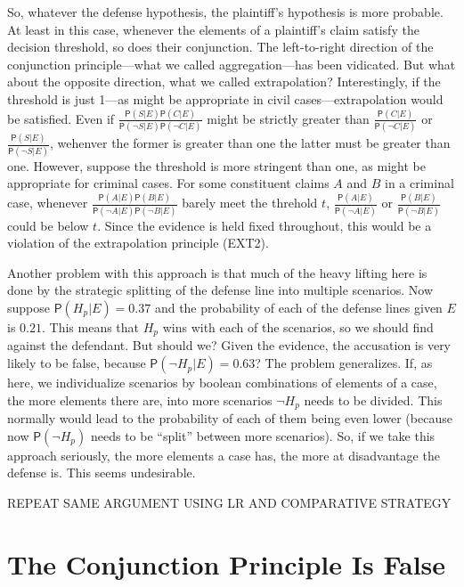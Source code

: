 \documentclass[10pt,dvipsnames,enabledeprecatedfontcommands]{scrartcl}
\newcommand{\n}{\neg}
\newcommand{\pr}[1]{\mathsf{P}(#1)}
\begin{document}
\noindent So, whatever the defense hypothesis, the plaintiff's
hypothesis is more probable. At least in this case, whenever the
elements of a plaintiff's claim satisfy the decision threshold, so does
their conjunction. The left-to-right direction of the conjunction
principle---what we called aggregation---has been vidicated. But what
about the opposite direction, what we called extrapolation?
Interestingly, if the threshold is just 1---as might be appropriate in
civil cases---extrapolation would be satisfied. Even if
\(\frac{\pr{S\vert E}\pr{C\vert E}}{\pr{\n S \vert E}\pr{\n C \vert E}}\)
might be strictly greater than
\(\frac{\pr{C\vert E}}{\pr{\n C \vert E}}\) or
\(\frac{\pr{S\vert E}}{\pr{\n S \vert E}}\), wehenver the former is
greater than one the latter must be greater than one. However, suppose
the threshold is more stringent than one, as might be appropriate for
criminal cases. For some constituent claims \(A\) and \(B\) in a
criminal case, whenever
\(\frac{\pr{A\vert E}\pr{B\vert E}}{\pr{\n A \vert E}\pr{\n B \vert E}}\)
barely meet the threhold \(t\),
\(\frac{\pr{A\vert E}}{\pr{\n A \vert E}}\) or
\(\frac{\pr{B\vert E}}{\pr{\n B \vert E}}\) could be below \(t\). Since
the evidence is held fixed throughout, this would be a violation of the
extrapolation principle (EXT2).

Another problem with this approach is that much of the heavy lifting
here is done by the strategic splitting of the defense line into
multiple scenarios. Now suppose \(\pr{H_p\vert E}=0.37\) and the
probability of each of the defense lines given \(E\) is \(0.21\). This
means that \(H_p\) wins with each of the scenarios, so we should find
against the defendant. But should we? Given the evidence, the accusation
is very likely to be false, because \(\pr{\n H_p \vert E}=0.63\)? The
problem generalizes. If, as here, we individualize scenarios by boolean
combinations of elements of a case, the more elements there are, into
more scenarios \(\n H_p\) needs to be divided. This normally would lead
to the probability of each of them being even lower (because now
\(\pr{\n H_p}\) needs to be ``split'' between more scenarios). So, if we
take this approach seriously, the more elements a case has, the more at
disadvantage the defense is. This seems undesirable.

REPEAT SAME ARGUMENT USING LR AND COMPARATIVE STRATEGY

\hypertarget{the-conjunction-principle-is-false}{%
\section{The Conjunction Principle Is
False}\label{the-conjunction-principle-is-false}}
\end{document}
